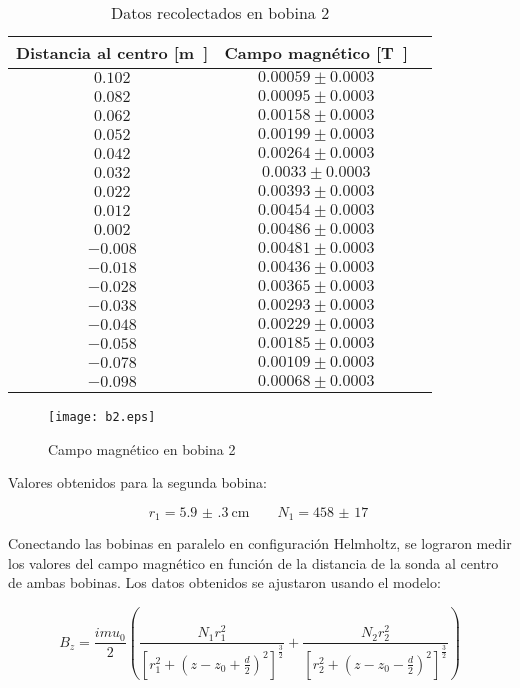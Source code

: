 \documentclass[12pt,a4paper]{article}
\begin{document}
\begin{table}[H]
 \centering
 \begin{tabular}{|c|c|c}
Distancia al centro [\si\meter] & Campo magnético [\si\tesla] \\
\hline
$ 0.102 $ & $ 0.00059 \pm 0.0003 $ \\
$ 0.082$ & $ 0.00095 \pm 0.0003 $ \\ 
$ 0.062 $ & $ 0.00158 \pm 0.0003 $ \\ 
$ 0.052 $ & $ 0.00199 \pm 0.0003 $ \\ 
$ 0.042 $ & $ 0.00264 \pm 0.0003 $ \\ 
$ 0.032 $ & $ 0.0033 \pm 0.0003 $ \\ 
$ 0.022 $ & $ 0.00393 \pm 0.0003 $ \\ 
$ 0.012 $ & $ 0.00454 \pm 0.0003 $ \\ 
$ 0.002 $ & $ 0.00486 \pm 0.0003 $ \\ 
$ -0.008 $ & $ 0.00481 \pm 0.0003 $ \\ 
$ -0.018 $ & $ 0.00436 \pm 0.0003 $ \\ 
$ -0.028 $ & $ 0.00365 \pm 0.0003 $ \\ 
$ -0.038 $ & $ 0.00293 \pm 0.0003 $ \\ 
$ -0.048 $ & $ 0.00229 \pm 0.0003 $ \\ 
$ -0.058 $ & $ 0.00185 \pm 0.0003 $ \\ 
$ -0.078 $ & $ 0.00109 \pm 0.0003 $ \\ 
$ -0.098 $ & $ 0.00068 \pm 0.0003 $ \\
 \end{tabular}
\caption{Datos recolectados en bobina 2} 
 \end{table}

\begin{figure}[H]
  \centering
   \texttt{[image: b2.eps]}
\caption{Campo magnético en bobina 2}
  \label{b2plot}
\end{figure}

Valores obtenidos para la segunda bobina:

$$r_1 = \SI{5.9(3)}{\centi\meter} \qquad N_1 = \SI{458(17)}{} $$


Conectando las bobinas en paralelo en configuración Helmholtz, se lograron medir los valores del campo magnético en función de la distancia de la sonda al centro de ambas bobinas. Los datos obtenidos se ajustaron usando el modelo:

$$ B_z =  \frac{i mu_0}{2}\left(\frac{N_1 r_1^2 }{\left[ r_1^2 + \left(z - z_0 +  \frac{d}{2} \right)^2\right]^{\frac{3}{2}}} + \frac{N_2 r_2^2 }{\left[ r_2^2 + \left(z - z_0 -  \frac{d}{2} \right)^2\right]^{\frac{3}{2}}} \right)$$
\end{document}

